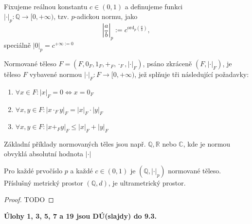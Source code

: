 \documentclass[../main.tex]{subfiles}
\begin{document}
\begin{definition}
    Fixujeme reálnou konstantu $c \in (0,1)$ a definujeme funkci\\
    $| \cdot |_p: \mathbb{Q} \to [0, +\infty)$, tzv. $p$-adickou normu, jako
    \[ \left| \frac{a}{b} \right|_p := c^{\text{ord}_p(\frac{a}{b})}, \]
    speciálně $|0|_p = c^{+\infty := 0}$
\end{definition}

\begin{definition}
    Normované těleso $F = (F, 0_F, 1_F, +_F, \cdot _F, |\cdot|_F)$, psáno zkráceně
    $(F, |\cdot|_F)$, je těleso $F$ vybavené normou $|\cdot|_F: F \to [0, +\infty)$, jež
    splňuje tři následující požadavky:
    \begin{enumerate}
        \item $ \forall x \in F: |x|_F = 0 \Leftrightarrow x = 0_F $
        \item $ \forall x,y \in F: |x\cdot _F y|_F = |x|_F \cdot |y|_F $
        \item $ \forall x,y \in F: |x +_F y|_F \leq |x|_F + |y|_F $
    \end{enumerate}
\end{definition}

\begin{example}
    Základní příklady normovaných těles jsou např. $\mathbb{Q}, \mathbb{R}$ nebo $\mathbb{C}$, kde
    je normou obvyklá absolutní hodnota $|\cdot|$
\end{example}

\begin{lemma}[o $|\cdot|_p$]
    Pro každé prvočíslo $p$ a každé $c \in (0,1)$ je $(\mathbb{Q}, |\cdot|_p)$ normované těleso.
    Příslušný metrický prostor $(\mathbb{Q}, d)$, je ultrametrický prostor.
\end{lemma}
\begin{proof}
    TODO
\end{proof}

\vspace{3mm}
\noindent
\textbf{Úlohy 1, 3, 5, 7 a 19 jsou DÚ(slajdy) do 9.3.}
\end{document}
